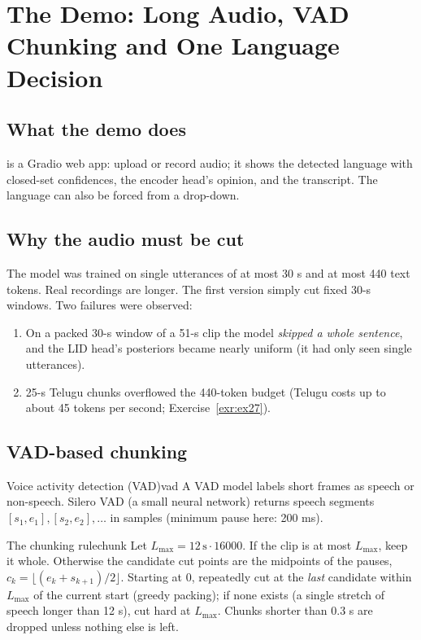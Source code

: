 \chapter{The Demo: Long Audio, VAD Chunking and One Language Decision}
\label{ch:demo}

\section{What the demo does}

 is a Gradio web app: upload or record audio; it shows the detected language with closed-set confidences, the
encoder head's opinion, and the transcript. The language can also be forced from a drop-down.

\section{Why the audio must be cut}

The model was trained on single utterances of at most 30 s and at most 440 text tokens. Real recordings are longer. The first
version simply cut fixed 30-s windows. Two failures were observed:
\begin{enumerate}
\item On a packed 30-s window of a 51-s clip the model \emph{skipped a whole sentence}, and the LID head's posteriors became nearly
uniform (it had only seen single utterances).
\item 25-s Telugu chunks overflowed the 440-token budget (Telugu costs up to about 45 tokens per second; Exercise~\ref{exr:ex27}).
\end{enumerate}

\section{VAD-based chunking}

\begin{definition}{Voice activity detection (VAD)}{vad}
A VAD model labels short frames as speech or non-speech. Silero VAD (a small neural network) returns speech segments
$[s_1,e_1],[s_2,e_2],\dots$ in samples (minimum pause here: 200 ms).
\end{definition}

\begin{definition}{The chunking rule}{chunk}
Let $L_{\max}=12\,\text{s}\cdot16000$. If the clip is at most $L_{\max}$, keep it whole. Otherwise the candidate cut points are the
midpoints of the pauses, $c_k=\lfloor(e_k+s_{k+1})/2\rfloor$. Starting at $0$, repeatedly cut at the \emph{last} candidate within
$L_{\max}$ of the current start (greedy packing); if none exists (a single stretch of speech longer than 12 s), cut hard at
$L_{\max}$. Chunks shorter than 0.3 s are dropped unless nothing else is left.
\end{definition}


